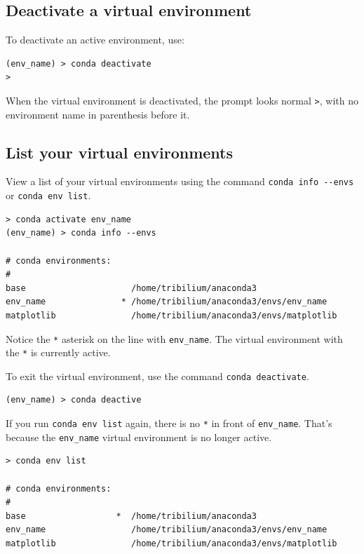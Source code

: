 \documentclass{book}
\begin{document}
    
        \subsection{Deactivate a virtual
environment}\label{deactivate-a-virtual-environment}

To deactivate an active environment, use:

\begin{lstlisting}
(env_name) > conda deactivate
>
\end{lstlisting}

When the virtual environment is deactivated, the prompt looks normal
\lstinline!>!, with no environment name in parenthesis before it.
    




    
        \subsection{List your virtual
environments}\label{list-your-virtual-environments}

View a list of your virtual environments using the command
\lstinline!conda info --envs! or \lstinline!conda env list!.

\begin{lstlisting}
> conda activate env_name
(env_name) > conda info --envs

# conda environments:
#
base                     /home/tribilium/anaconda3
env_name               * /home/tribilium/anaconda3/envs/env_name
matplotlib               /home/tribilium/anaconda3/envs/matplotlib
\end{lstlisting}

Notice the \lstinline!*! asterisk on the line with \lstinline!env_name!.
The virtual environment with the \lstinline!*! is currently active.

To exit the virtual environment, use the command
\lstinline!conda deactivate!.

\begin{lstlisting}
(env_name) > conda deactive
\end{lstlisting}

If you run \lstinline!conda env list! again, there is no \lstinline!*!
in front of \lstinline!env_name!. That's because the
\lstinline!env_name! virtual environment is no longer active.

\begin{lstlisting}
> conda env list

# conda environments:
#
base                  *  /home/tribilium/anaconda3
env_name                 /home/tribilium/anaconda3/envs/env_name
matplotlib               /home/tribilium/anaconda3/envs/matplotlib
\end{lstlisting}
    
\end{document}
